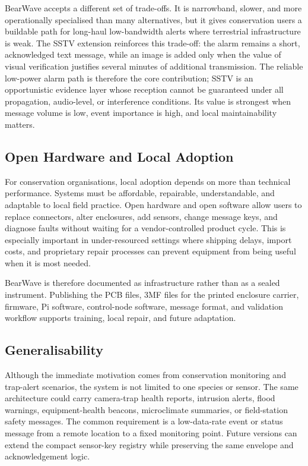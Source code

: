 \documentclass[acmsmall,screen]{acmart}
\begin{document}
BearWave accepts a different set of trade-offs. It is narrowband, slower, and more operationally specialised than many alternatives, but it gives conservation users a buildable path for long-haul low-bandwidth alerts where terrestrial infrastructure is weak. The SSTV extension reinforces this trade-off: the alarm remains a short, acknowledged text message, while an image is added only when the value of visual verification justifies several minutes of additional transmission. The reliable low-power alarm path is therefore the core contribution; SSTV is an opportunistic evidence layer whose reception cannot be guaranteed under all propagation, audio-level, or interference conditions. Its value is strongest when message volume is low, event importance is high, and local maintainability matters.

\subsection{Open Hardware and Local Adoption}
For conservation organisations, local adoption depends on more than technical performance. Systems must be affordable, repairable, understandable, and adaptable to local field practice. Open hardware and open software allow users to replace connectors, alter enclosures, add sensors, change message keys, and diagnose faults without waiting for a vendor-controlled product cycle. This is especially important in under-resourced settings where shipping delays, import costs, and proprietary repair processes can prevent equipment from being useful when it is most needed.

BearWave is therefore documented as infrastructure rather than as a sealed instrument. Publishing the PCB files, 3MF files for the printed enclosure carrier, firmware, Pi software, control-node software, message format, and validation workflow supports training, local repair, and future adaptation.

\subsection{Generalisability}
Although the immediate motivation comes from conservation monitoring and trap-alert scenarios, the system is not limited to one species or sensor. The same architecture could carry camera-trap health reports, intrusion alerts, flood warnings, equipment-health beacons, microclimate summaries, or field-station safety messages. The common requirement is a low-data-rate event or status message from a remote location to a fixed monitoring point. Future versions can extend the compact sensor-key registry while preserving the same envelope and acknowledgement logic.
\end{document}
